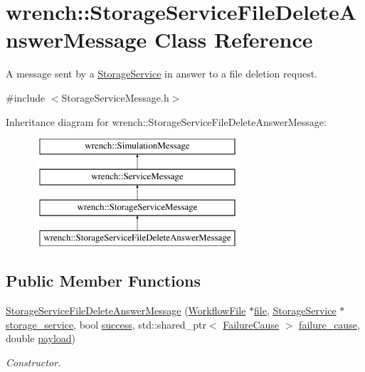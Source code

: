 \hypertarget{classwrench_1_1_storage_service_file_delete_answer_message}{}\section{wrench\+:\+:Storage\+Service\+File\+Delete\+Answer\+Message Class Reference}
\label{classwrench_1_1_storage_service_file_delete_answer_message}


A message sent by a \hyperlink{classwrench_1_1_storage_service}{Storage\+Service} in answer to a file deletion request.  




{\ttfamily \#include $<$Storage\+Service\+Message.\+h$>$}

Inheritance diagram for wrench\+:\+:Storage\+Service\+File\+Delete\+Answer\+Message\+:\begin{figure}[H]
\begin{center}
\leavevmode
\includegraphics[height=4.000000cm]{classwrench_1_1_storage_service_file_delete_answer_message}
\end{center}
\end{figure}
\subsection*{Public Member Functions}
\begin{DoxyCompactItemize}
\item 
\hyperlink{classwrench_1_1_storage_service_file_delete_answer_message_afe8fdd6488b3027bb80a4e17ead3124d}{Storage\+Service\+File\+Delete\+Answer\+Message} (\hyperlink{classwrench_1_1_workflow_file}{Workflow\+File} $\ast$\hyperlink{classwrench_1_1_storage_service_file_delete_answer_message_ad5f601fb45fdde52ed8cadfba1605d4a}{file}, \hyperlink{classwrench_1_1_storage_service}{Storage\+Service} $\ast$\hyperlink{classwrench_1_1_storage_service_file_delete_answer_message_a0edc62449719d2212d5fa344103213c5}{storage\+\_\+service}, bool \hyperlink{classwrench_1_1_storage_service_file_delete_answer_message_a5c59359a3d99a50d73af047bf22c18ff}{success}, std\+::shared\+\_\+ptr$<$ \hyperlink{classwrench_1_1_failure_cause}{Failure\+Cause} $>$ \hyperlink{classwrench_1_1_storage_service_file_delete_answer_message_a50f267b99a1140fba0243ffbe59c6c24}{failure\+\_\+cause}, double \hyperlink{classwrench_1_1_simulation_message_a914f2732713f7c02898e66f05a7cb8a1}{payload})
\begin{DoxyCompactList}\small\item\em Constructor. \end{DoxyCompactList}\end{DoxyCompactItemize}
